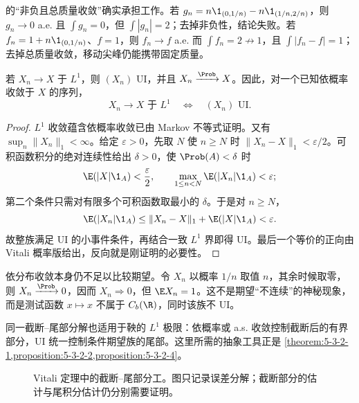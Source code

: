 \Scheffe{} 的“非负且总质量收敛”确实承担工作。若
$g_n=n\1_{(0,1/n)}-n\1_{(1/n,2/n)}$，则 $g_n\to0$ a.e. 且 $\int g_n=0$，但
$\int|g_n|=2$；去掉非负性，结论失败。若
$f_n=1+n\1_{(0,1/n)}$、$f=1$，则 $f_n\to f$ a.e. 而
$\int f_n=2\not\to1$，且 $\int|f_n-f|=1$；去掉总质量收敛，移动尖峰仍能携带固定质量。

\begin{proposition}\label{proposition:5-3-2-4}
若 $X_n\to X$ 于 $L^1$，则 $(X_n)$ UI，并且 $X_n\xrightarrow{\Prob}X$。因此，对一个已知依概率收敛于 $X$ 的序列，
\[
 X_n\to X\text{ 于 }L^1
 \quad\Longleftrightarrow\quad
 (X_n)\text{ UI}.
\]
\end{proposition}

\begin{proof}
$L^1$ 收敛蕴含依概率收敛已由 Markov 不等式证明。又有
$\sup_n\|X_n\|_1<\infty$。给定 $\varepsilon>0$，先取 $N$ 使 $n\ge N$ 时
$\|X_n-X\|_1<\varepsilon/2$。可积函数积分的绝对连续性给出 $\delta>0$，使 $\Prob(A)<\delta$ 时
\[
 \E(|X|\1_A)<\frac\varepsilon2,
 \qquad
 \max_{1\le n<N}\E(|X_n|\1_A)<\varepsilon;
\]
第二个条件只需对有限多个可积函数取最小的 $\delta$。于是对 $n\ge N$，
\[
 \E(|X_n|\1_A)
 \le\|X_n-X\|_1+\E(|X|\1_A)<\varepsilon.
\]
故整族满足 UI 的小事件条件，再结合一致 $L^1$ 界即得 UI。最后一个等价的正向由 Vitali 概率版给出，反向就是刚证明的必要性。
\end{proof}

依分布收敛本身仍不足以比较期望。令 $X_n$ 以概率 $1/n$ 取值 $n$，其余时候取零，则
$X_n\xrightarrow{\Prob}0$，因而 $X_n\Rightarrow0$，但 $\E X_n=1$。这不是期望“不连续”的神秘现象，而是测试函数 $x\mapsto x$ 不属于 $C_b(\R)$，同时该族不 UI。

同一截断--尾部分解也适用于鞅的 $L^1$ 极限：依概率或 a.s. 收敛控制截断后的有界部分，UI
统一控制条件期望族的尾部。这里所需的抽象工具正是
\cref{theorem:5-3-2-1,proposition:5-3-2-2,proposition:5-3-2-4}。

\begin{figure}[htbp]
\centering
{}
\caption{Vitali 定理中的截断--尾部分工。图只记录误差分解；截断部分的估计与尾积分估计仍分别需要证明。}
\label{fig:5-3-2-vitali-body-tail}
\end{figure}

